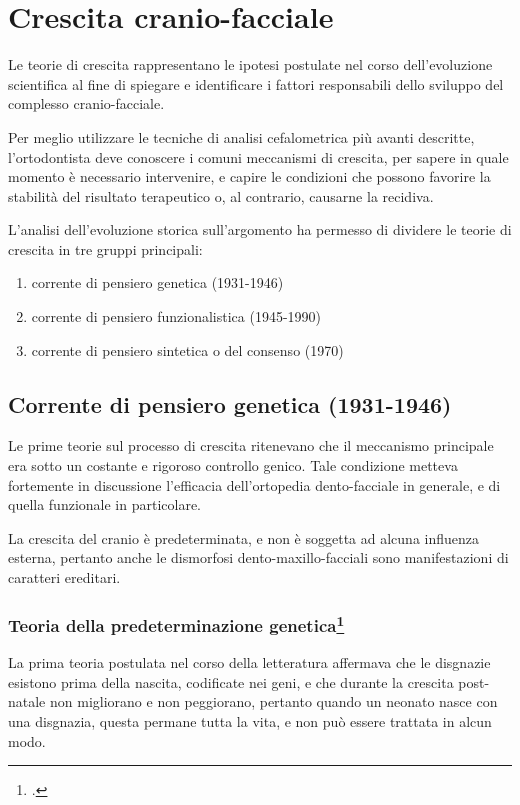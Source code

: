 \chapter{Crescita cranio-facciale}
\nocite{Enlow1986,Cozza2006}

Le teorie di crescita rappresentano le ipotesi postulate nel corso dell'evoluzione scientifica al fine di spiegare e identificare i fattori responsabili dello sviluppo del complesso cranio-facciale.

Per meglio utilizzare le tecniche di analisi cefalometrica più avanti descritte, l'ortodontista deve conoscere i comuni meccanismi di crescita, per sapere in quale momento è necessario intervenire, e capire le condizioni che possono favorire la stabilità del risultato terapeutico o, al contrario, causarne la recidiva.

L'analisi dell'evoluzione storica sull'argomento ha permesso di dividere le teorie di crescita in tre gruppi principali:
\begin{enumerate}
\item corrente di pensiero genetica (1931-1946)
\item corrente di pensiero funzionalistica (1945-1990)
\item corrente di pensiero sintetica o del consenso (1970)
\end{enumerate}

\section{Corrente di pensiero genetica (1931-1946)}
Le prime teorie sul processo di crescita ritenevano che il meccanismo principale era sotto un costante e rigoroso controllo genico. Tale condizione metteva fortemente in discussione l'efficacia dell'ortopedia dento-facciale in generale, e di quella funzionale in particolare.

La crescita del cranio è predeterminata, e non è soggetta ad alcuna influenza esterna, pertanto anche le dismorfosi dento-maxillo-facciali sono manifestazioni di caratteri ereditari.

\subsection*{Teoria della predeterminazione genetica\protect\footcite{Broadbent1931,Broadbent1937,Brodie1941,Brodie1946}}
La prima teoria postulata nel corso della letteratura affermava che le disgnazie esistono prima della nascita, codificate nei geni, e che durante la crescita post-natale non migliorano e non peggiorano, pertanto quando un neonato nasce con una disgnazia, questa permane tutta la vita, e non può essere trattata in alcun modo.


